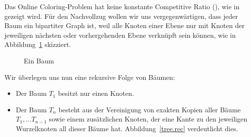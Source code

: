 \documentclass[11pt]{scrreprt} %
\theoremstyle{definition}
\begin{document}
\bigskip

Das Online Coloring-Problem hat keine konstante Competitive Ratio (\cite{bipartite}), wie in \cite{gyarfas} gezeigt wird. Für den Nachvollzug wollen wir uns vergegenwärtigen, dass jeder Baum ein bipartiter Graph ist, weil alle Knoten einer Ebene nur mit Knoten der jeweiligen nächsten oder vorhergehenden Ebene verknüpft sein können, wie in Abbildung~\ref{tree} skizziert.

\begin{figure}
\caption{Ein Baum}
\label{tree}
\begin{center}
\end{center}
\end{figure}

Wir überlegen uns nun eine rekursive Folge von Bäumen:
\begin{itemize}
\item Der Baum $T_1$ besitzt nur einen Knoten.
\item Der Baum $T_n$ besteht aus der Vereinigung von exakten Kopien aller Bäume $T_1, \dots T_{n-1}$ sowie einem zusätzlichen Knoten, der eine Kante zu den jeweiligen Wurzelknoten all dieser Bäume hat. Abbildung~\ref{tree.rec} verdeutlicht dies.
\end{itemize}
\end{document}

